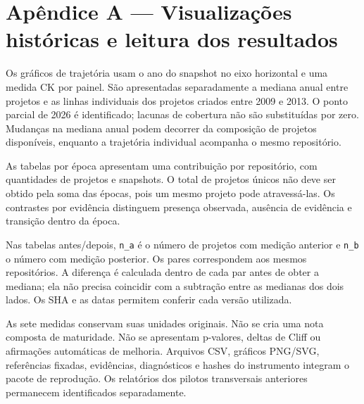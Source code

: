 \section*{Apêndice A --- Visualizações históricas e leitura dos resultados}
\label{ap:visualizacoes}

Os gráficos de trajetória usam o ano do snapshot no eixo horizontal e uma medida CK por painel. São apresentadas separadamente a mediana anual entre projetos e as linhas individuais dos projetos criados entre 2009 e 2013. O ponto parcial de 2026 é identificado; lacunas de cobertura não são substituídas por zero. Mudanças na mediana anual podem decorrer da composição de projetos disponíveis, enquanto a trajetória individual acompanha o mesmo repositório.

As tabelas por época apresentam uma contribuição por repositório, com quantidades de projetos e snapshots. O total de projetos únicos não deve ser obtido pela soma das épocas, pois um mesmo projeto pode atravessá-las. Os contrastes por evidência distinguem presença observada, ausência de evidência e transição dentro da época.

Nas tabelas antes/depois, \texttt{n\_a} é o número de projetos com medição anterior e \texttt{n\_b} o número com medição posterior. Os pares correspondem aos mesmos repositórios. A diferença é calculada dentro de cada par antes de obter a mediana; ela não precisa coincidir com a subtração entre as medianas dos dois lados. Os SHA e as datas permitem conferir cada versão utilizada.

As sete medidas conservam suas unidades originais. Não se cria uma nota composta de maturidade. Não se apresentam p-valores, deltas de Cliff ou afirmações automáticas de melhoria. Arquivos CSV, gráficos PNG/SVG, referências fixadas, evidências, diagnósticos e hashes do instrumento integram o pacote de reprodução. Os relatórios dos pilotos transversais anteriores permanecem identificados separadamente.
